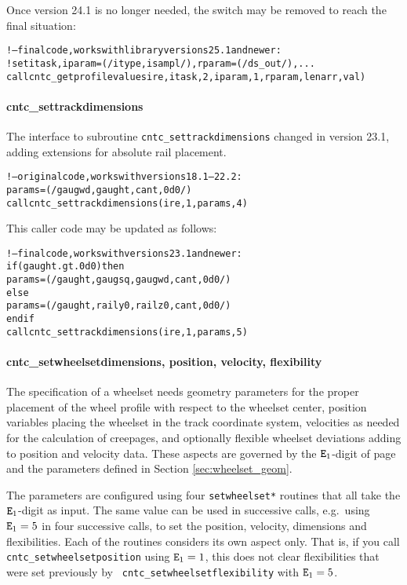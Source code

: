 \documentclass[12pt]{report}
\begin{document}
Once version 24.1 is no longer needed, the switch may be removed to reach
the final situation:

{\scriptsize\begin{alltt}
!--final code, works with library versions 25.1 and newer:
   ! set itask, iparam = (/ itype, isampl /), rparam = (/ ds_out /), ...
   call cntc_getprofilevalues\red{(}ire, itask, 2, iparam, 1, rparam, lenarr, val) 
\end{alltt}}

\paragraph{cntc\_settrackdimensions}

The interface to subroutine {\tt cntc\_settrackdimensions} changed in
version 23.1, adding extensions for absolute rail placement.

{\scriptsize\begin{alltt}
!--original code, works with versions 18.1 -- 22.2:
   params = (/ gaugwd, gaught, cant, 0d0 /)
   call cntc_settrackdimensions(ire, 1, params, 4) 
\end{alltt}}

This caller code may be updated as follows:

{\scriptsize\begin{alltt}
!--final code, works with versions 23.1 and newer:
   if (gaught.gt.0d0) then
      params = (/ gaught, gaugsq, gaugwd, cant, 0d0 /)
   else
      params = (/ gaught, raily0, railz0, cant, 0d0 /)
   endif
   call cntc_settrackdimensions(ire, 1, params, 5) 
\end{alltt}}

\paragraph{cntc\_setwheelsetdimensions, position, velocity, flexibility}

The specification of a wheelset needs geometry parameters for the proper
placement of the wheel profile with respect to the wheelset center,
position variables placing the wheelset in the track coordinate system,
velocities as needed for the calculation of creepages, and optionally
flexible wheelset deviations adding to position and velocity data.
These aspects are governed by the ${\tt E}_1$-digit of page
\pageref{e1-digit} and the parameters defined in Section 
\ref{sec:wheelset_geom}. 

The parameters are configured using four {\tt setwheelset*} routines that
all take the ${\tt E}_1$-digit as input. The same value can be used in
successive calls, e.g.\ using ${\tt E}_1=5$ in four successive calls, to set
the position, velocity, dimensions and flexibilities. Each of the routines
considers its own aspect only. That is, if you call {\tt 
cntc\_setwheelsetposition} using ${\tt E}_1=1$, this does not clear
flexibilities that were set previously by {\tt 
cntc\_setwheelsetflexibility} with ${\tt E}_1=5$.
\end{document}
